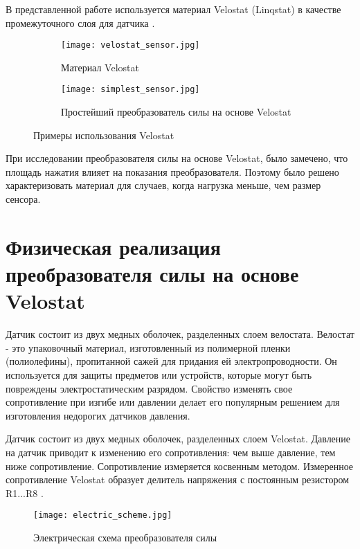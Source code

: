 В представленной работе используется материал Velostat (Linqstat)  в качестве промежуточного слоя для датчика .

\begin{figure}[H]
    \begin{subfigure}[t]{0.9\textwidth}
        \centering\texttt{[image: velostat\_sensor.jpg]}
        \caption{Материал Velostat}
        \label{fig:velostat_sensor.jpg}
    \end{subfigure}

    \begin{subfigure}[t]{0.95\textwidth}
        \centering\texttt{[image: simplest\_sensor.jpg]}
        \caption{Простейший преобразователь силы на основе Velostat}
        \label{fig:simplest_sensor.jpg}
    \end{subfigure}
    \caption{Примеры использования Velostat}
\end{figure}

При исследовании преобразователя силы на основе Velostat, было замечено, что площадь нажатия влияет на показания преобразователя. Поэтому было решено характеризовать материал для случаев, когда нагрузка меньше, чем размер сенсора.

\section{Физическая реализация преобразователя силы на основе Velostat}

Датчик состоит из двух медных оболочек, разделенных слоем велостата. Велостат - это упаковочный материал, изготовленный из полимерной пленки (полиолефины), пропитанной сажей для придания ей электропроводности. Он используется для защиты предметов или устройств, которые могут быть повреждены электростатическим разрядом. Свойство изменять свое сопротивление при изгибе или давлении делает его популярным решением для изготовления недорогих датчиков давления.

Датчик состоит из двух медных оболочек, разделенных слоем Velostat. Давление на датчик приводит к изменению его сопротивления: чем выше давление, тем ниже сопротивление. Сопротивление измеряется косвенным методом. Измеренное сопротивление Velostat образует делитель напряжения с постоянным резистором R1...R8 .


\begin{figure}[H]
\centering\texttt{[image: electric\_scheme.jpg]}\\
\caption{Электрическая схема преобразователя силы}
\label{fig:el_scheme}
\end{figure}

